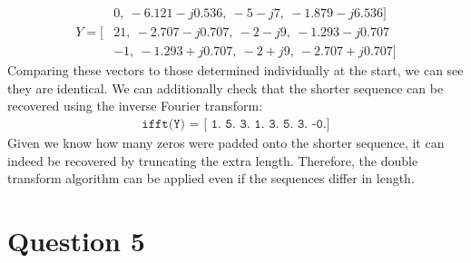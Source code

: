 \documentclass[a4paper, 11pt]{article}
\begin{document}
\begin{enumerate}[label=\alph*)]
\begin{align*}
             &0,\ -6.121-j0.536,\ -5-j7,\ -1.879-j6.536] \\
        Y = [&21,\ -2.707-j0.707,\ -2-j9,\ -1.293-j0.707 \\
             &-1,\ -1.293+j0.707,\ -2+j9,\ -2.707+j0.707]
    \end{align*}
    Comparing these vectors to those determined individually at the start, we
    can see they are identical. We can additionally check that the shorter
    sequence can be recovered using the inverse Fourier transform:
    \begin{align*}
        \texttt{ifft(Y) = [ 1.  5.  3.  1.  3.  5.  3. -0.]}
    \end{align*}
    Given we know how many zeros were padded onto the shorter sequence, it can
    indeed be recovered by truncating the extra length. Therefore, the double
    transform algorithm can be applied even if the sequences differ in length.

\end{enumerate}

\newpage
\section*{Question 5}
\end{document}
